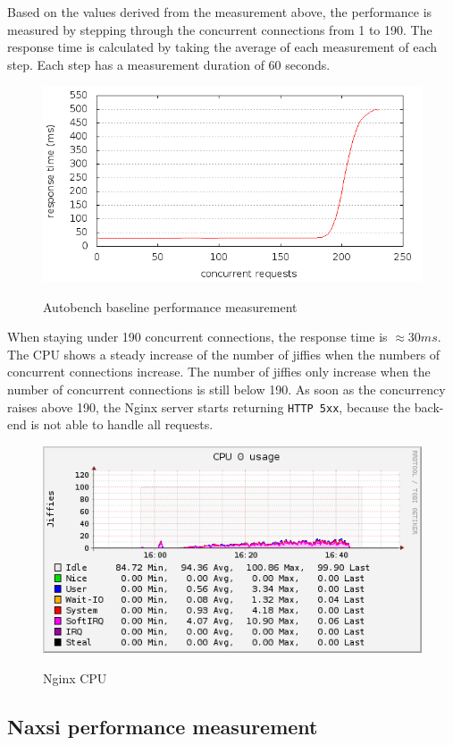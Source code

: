 \documentclass[Measurements]{subfiles}
\begin{document}
Based on the values derived from the measurement above, the performance is measured by stepping through the concurrent connections from 1 to 190. The response time is calculated by taking the average of each measurement of  each step. Each step has a measurement duration of 60 seconds. 

\begin{figure}[h]
\caption{Autobench baseline performance measurement}
\centering
\includegraphics[scale=0.4] {images/results/baseline/output.png}
\label{fig:Baseline performance measurement}
\end{figure}

When staying under 190 concurrent connections, the response time is $\approx 30 ms$. The CPU shows a steady increase of the number of jiffies when the numbers of concurrent connections increase. The number of jiffies only increase when the number of concurrent connections is still below 190. As soon as the concurrency raises above 190, the Nginx server starts returning \verb+HTTP 5xx+, because the back-end is not able to handle all requests.

\begin{figure}[h]
\caption{Nginx CPU}
\centering
\includegraphics[scale=0.4] {images/results/baseline/cpu.png}
\label{fig:Baseline performance measurement}
\end{figure}

\subsection{Naxsi performance measurement}
\end{document}
